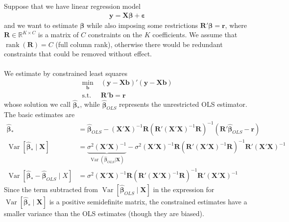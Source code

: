\documentclass[12pt]{article}
\theoremstyle{plain}
\theoremstyle{definition}
\theoremstyle{remark}
\newcommand{\bsb}{\boldsymbol{b}}
\newcommand{\bsX}{\boldsymbol{X}}
\newcommand{\bsy}{\boldsymbol{y}}
\newcommand{\bsvarepsilon}{\boldsymbol{\varepsilon}}
\newcommand{\bsbeta}{\boldsymbol{\beta}}
\newcommand{\bshatbeta}{\boldsymbol{\hat{\beta}}}
\newcommand{\bsR}{\boldsymbol{R}}
\newcommand{\bsr}{\boldsymbol{r}}
\newcommand{\R}{\mathbb{R}}
\newcommand{\rank}{\operatorname{rank}}
\newcommand{\Var}{\operatorname{Var}}
\begin{document}
Suppose that we have linear regression model
\begin{align*}
  \bsy = \bsX\bsbeta + \bsvarepsilon
\end{align*}
and we want to estimate $\bsbeta$ while also imposing some restrictions
$\bsR'\bsbeta = \bsr$, where $\bsR\in\R^{K\times C}$ is a matrix of $C$
constraints on the $K$ coefficients. We assume that $\rank(\bsR)=C$
(full column rank), otherwise there would be redundant constraints that
could be removed without effect.
\\
\\
We estimate by constrained least squares
\begin{align*}
  \min_{\bsb} \; &(\bsy-\bsX\bsb)'(\bsy-\bsX\bsb)
  \\
  \text{s.t.} \; &
    \bsR'\bsb = \bsr
\end{align*}
whose solution we call $\bshatbeta_*$, while $\bshatbeta_{OLS}$
represents the unrestricted OLS estimator.
The basic estimates are
\begin{align*}
  \bshatbeta_*
  &=
  \bshatbeta_{OLS} - \left(\bsX'\bsX\right)^{-1}  \bsR
  \left(\bsR'\left(\bsX'\bsX\right)^{-1}  \bsR\right)^{-1}
  \left(\bsR'\bshatbeta_{OLS} -  \bsr\right)
  \\
  \Var[\bshatbeta_*\;|\;\bsX]
  &=
  \underbrace{\sigma^2(\bsX'\bsX)^{-1}}_{\Var(\bshatbeta_{OLS}|\bsX)}
  -
  \sigma^2(\bsX'\bsX)^{-1}  \bsR
  \left(\bsR'(\bsX'\bsX)^{-1}  \bsR\right)^{-1} \bsR'(\bsX'\bsX)^{-1}
  \\
  \Var\left[ \bshatbeta_*-\bshatbeta_{OLS} \;|\;X\right]
  &=
  \sigma^2
  \left(\bsX'\bsX\right)^{-1}  \bsR
  \left(\bsR'\left(\bsX'\bsX\right)^{-1}  \bsR\right)^{-1} \bsR'
  \left(\bsX'\bsX\right)^{-1}
\end{align*}
Since the term subtracted from $\Var[\bshatbeta_{OLS}\;|\;\bsX]$ in the
expression for $\Var[\bshatbeta_*\;|\;\bsX]$ is a positive semidefinite
matrix, the constrained estimates have a smaller variance than the OLS
estimates (though they are biased).
\end{document}
